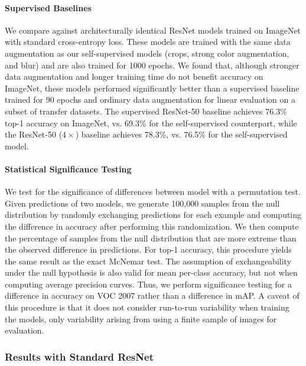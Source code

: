 \documentclass{article}
\begin{document}
\paragraph{Supervised Baselines} We compare against architecturally identical ResNet models trained on ImageNet with standard cross-entropy loss. These models are trained with the same data augmentation as our self-supervised models (crops, strong color augmentation, and blur) and are also trained for 1000 epochs. We found that, although stronger data augmentation and longer training time do not benefit accuracy on ImageNet, these models performed significantly better than a supervised baseline trained for 90 epochs and ordinary data augmentation for linear evaluation on a subset of transfer datasets. The supervised ResNet-50 baseline achieves 76.3\% top-1 accuracy on ImageNet, vs. 69.3\% for the self-supervised counterpart, while the ResNet-50 ($4 \times$) baseline achieves 78.3\%, vs. 76.5\% for the self-supervised model.

\paragraph{Statistical Significance Testing} We test for the significance of differences between model with a permutation test. Given predictions of two models, we generate 100,000 samples from the null distribution by randomly exchanging predictions for each example and computing the difference in accuracy after performing this randomization. We then compute the percentage of samples from the null distribution that are more extreme than the observed difference in predictions. For top-1 accuracy, this procedure yields the same result as the exact McNemar test. The assumption of exchangeability under the null hypothesis is also valid for mean per-class accuracy, but not when computing average precision curves. Thus, we perform significance testing for a difference in accuracy on VOC 2007 rather than a difference in mAP. A caveat of this procedure is that it does not consider run-to-run variability when training the models, only variability arising from using a finite sample of images for evaluation.

\subsubsection{Results with Standard ResNet}
\end{document}
